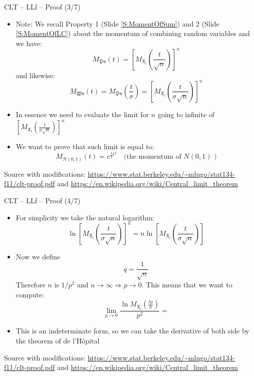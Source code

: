 \documentclass{beamer}
\begin{document}
\begin{frame}
{\centerline{CLT -- LLf -- Proof (3/7)}}


\begin{itemize}
\item Note: We recall Property 1 (Slide \ref{S:MomentOfSum}) and 2 (Slide \ref{S:MomentOfLC}) about the momentum of combining random variables and we have:
$$M_\mathfrak{Dn}(t) = \left [ M_\mathfrak{X_i}(\frac{t}{\sqrt{n}}) \right ] ^ n$$
and likewise:
$$M_\mathfrak{Wn}(t)  = M_\mathfrak{Dn} \left (\frac{t}{\sigma} \right ) = \left [ M_\mathfrak{X_i} \left (\frac{t}{\sigma\sqrt{n}} \right ) \right ] ^ n $$


\item In essence we need to evaluate the limit for $n$ going to infinite of $\left [ M_\mathfrak{X_i} \left (\frac{t}{\sigma\sqrt{n}} \right ) \right ] ^ n $
\item We want to prove that such limit is equal to:
$$M_{N(0,1)}(t) = e^{\frac{1}{2}t^2} \text{~~~(the momentum of }N(0,1)\text{~)}$$
\end{itemize}

\begin{center}
\tiny 
Source with modifications: \url{https://www.stat.berkeley.edu/~mlugo/stat134-f11/clt-proof.pdf} and \url{https://en.wikipedia.org/wiki/Central_limit_theorem}
\end{center}
\end{frame}


\begin{frame}
{\centerline{CLT -- LLf -- Proof (4/7)}}

\begin{itemize}
\item For simplicity we take the natural logarithm:
$$ \ln \left [ M_\mathfrak{X_i} \left (\frac{t}{\sigma\sqrt{n}} \right ) \right ] ^ n = n \ln \left [ M_\mathfrak{X_i} \left (\frac{t}{\sigma\sqrt{n}} \right ) \right ]  $$
\item Now we define
$$q = \frac{1}{\sqrt{n}}$$
Therefore $n$ is $1/p^2$ and $n \rightarrow \infty \Rightarrow p \rightarrow 0$. This means that we want to compute:
$$\lim_{p \to 0} \frac{\ln M_\mathfrak{X_i}(\frac{tp}{\sigma})}{p^2} = $$
\item This is an indeterminate form, so we can take the derivative of both side by the theorem of de l'H\^{o}pital

\end{itemize}

\begin{center}
\tiny 
Source with modifications: \url{https://www.stat.berkeley.edu/~mlugo/stat134-f11/clt-proof.pdf} and \url{https://en.wikipedia.org/wiki/Central_limit_theorem}
\end{center}
\end{frame}
\end{document}
